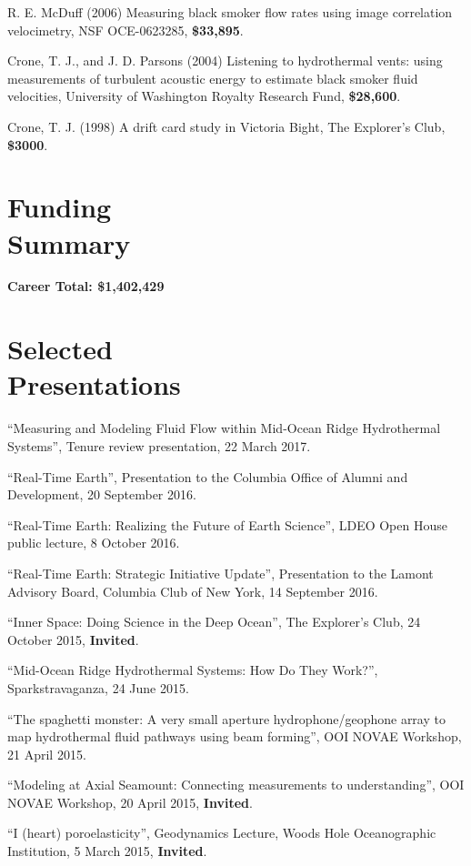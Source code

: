 \documentclass[11pt]{res}
\begin{document}
\begin{resume}
R. E. McDuff (2006) Measuring black smoker flow rates using image correlation velocimetry, NSF OCE-0623285, {\bf\$33,895}.

Crone, T. J., and J. D. Parsons (2004) Listening to hydrothermal vents: using measurements of turbulent acoustic energy to estimate black smoker fluid velocities, University of Washington Royalty Research Fund, {\bf\$28,600}.

Crone, T. J. (1998) A drift card study in Victoria Bight, The Explorer's Club, {\bf\$3000}.

\section{\sc Funding\\Summary}
{\bf Career Total: \$1,402,429}
\vspace{0.2in}

\section{\sc Selected\\Presentations}

``Measuring and Modeling Fluid Flow within Mid-Ocean Ridge Hydrothermal Systems'', Tenure review presentation, 22 March 2017.

``Real-Time Earth'', Presentation to the Columbia Office of Alumni and Development, 20 September 2016.

``Real-Time Earth: Realizing the Future of Earth Science'', LDEO Open House public lecture, 8 October 2016.

``Real-Time Earth: Strategic Initiative Update'', Presentation to the Lamont Advisory Board, Columbia Club of New York, 14 September 2016.

``Inner Space: Doing Science in the Deep Ocean'', The Explorer's Club, 24 October 2015, {\bf Invited}.

``Mid-Ocean Ridge Hydrothermal Systems: How Do They Work?'', Sparkstravaganza, 24 June 2015.

``The spaghetti monster: A very small aperture hydrophone/geophone array to map hydrothermal fluid pathways using beam forming'', OOI NOVAE Workshop, 21 April 2015.

``Modeling at Axial Seamount: Connecting measurements to understanding'', OOI NOVAE Workshop, 20 April 2015, {\bf Invited}.

``I (heart) poroelasticity'', Geodynamics Lecture, Woods Hole Oceanographic Institution, 5 March 2015, {\bf Invited}.


\end{resume}
\end{document}
